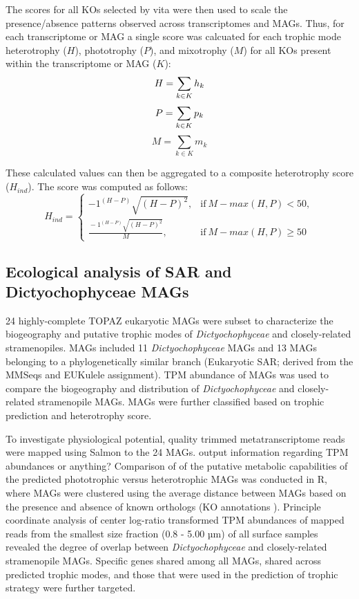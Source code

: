 \documentclass[12pt]{article}
\numberwithin{equation}{section}
\begin{document}
The scores for all KOs selected by vita were then used to scale the presence/absence patterns observed across transcriptomes and MAGs. Thus, for each transcriptome or MAG a single score was calcuated for each trophic mode heterotrophy ($H$), phototrophy ($P$), and mixotrophy ($M$) for all KOs present within the transcriptome or MAG ($K$):
  \begin{equation}\label{eq:sum}
  H = \sum_{k \in K} h_k \\ 
  \end{equation}
  \begin{equation}
    P = \sum_{k \in K} p_k \\
\end{equation}
  \begin{equation}
    M = \sum_{k \in K} m_k
\end{equation}

These calculated values can then be aggregated to a composite heterotrophy score ($H_{ind}$). The score was computed as follows: 
\begin{equation}\label{eq:hind}
  H_{ind}=
    \begin{cases}
      -1^{(H-P)}\sqrt{(H-P)^2}, & \text{if}\ M-max(H,P)<50, \\
      \frac{{}-1^{(H-P)}\sqrt{(H-P)^2}}{M}, & \text{if} \ M-max(H,P) \geq 50
    \end{cases}
  \end{equation}
  
\subsection*{Ecological analysis of SAR and Dictyochophyceae MAGs}
24 highly-complete TOPAZ eukaryotic MAGs were subset to characterize the biogeography and putative trophic modes of \emph{Dictyochophyceae} and closely-related stramenopiles. MAGs included 11 \emph{Dictyochophyceae} MAGs and 13 MAGs belonging to a phylogenetically similar branch (Eukaryotic SAR; derived from the MMSeqs and EUKulele assignment). TPM abundance of MAGs was used to compare the biogeography and distribution of \emph{Dictyochophyceae} and closely-related stramenopile MAGs. MAGs were further classified based on trophic prediction and heterotrophy score. 

To investigate physiological potential, quality trimmed metatranscriptome reads were mapped using Salmon \cite{Patro2017Salmon} to the 24 MAGs. output information regarding TPM abundances or anything? Comparison of of the putative metabolic capabilities of the predicted phototrophic versus heterotrophic MAGs was conducted in R, where MAGs were clustered using the average distance between MAGs based on the presence and absence of known orthologs (KO annotations \citep{Kanehisa_2019}). Principle coordinate analysis of center log-ratio transformed TPM abundances of mapped reads from the smallest size fraction (0.8 - 5.00 µm) of all surface samples revealed the degree of overlap between \emph{Dictyochophyceae} and closely-related stramenopile MAGs. Specific genes shared among all MAGs, shared across predicted trophic modes, and those that were used in the prediction of trophic strategy \citep{} were further targeted.
\end{document}
